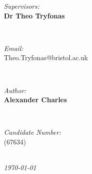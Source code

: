 \documentclass[fontsize=9.5pt]{extarticle}
\makeatletter
\numberwithin{figure}{section} %
\newcommand{\StudentNameA}{Alexander Charles}
\newcommand{\StudentNumberA}{67634}
\newcommand{\SupervisorNameA}{Dr Theo Tryfonas}
\newcommand{\SupervisorEmailA}{Theo.Tryfonas@bristol.ac.uk}
\makeatother
\begin{document}
\begin{titlepage}
\begin{minipage}{0.4\textwidth}
\begin{flushleft} \large
\emph{Supervisors:}\\
\textbf{\SupervisorNameA}\\
\end{flushleft}
\end{minipage}
~
\begin{minipage}{0.4\textwidth}
\begin{flushright} \large
\emph{Email:} \\
\SupervisorEmailA\\

\end{flushright}
\end{minipage}\\[1cm]

\begin{minipage}{0.4\textwidth}
\begin{flushleft} \large
\emph{Author:}\\
	\textbf{\StudentNameA}
\end{flushleft}
\end{minipage}
~
\begin{minipage}{0.4\textwidth}
\begin{flushright} \large
\emph{Candidate Number:} \\
(\StudentNumberA)\\
\end{flushright}
\end{minipage}\\[2cm]

\textit{{\large \today}}\\[1cm] %
\vfill %
\end{titlepage}
\end{document}

